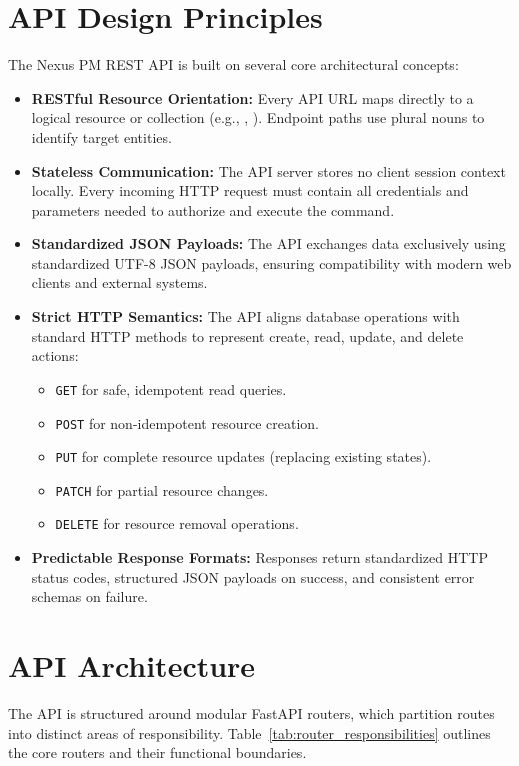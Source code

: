 \section{API Design Principles}
The Nexus PM REST API is built on several core architectural concepts:
\begin{itemize}
    \item \textbf{RESTful Resource Orientation:} Every API URL maps directly to a logical resource or collection (e.g., , ). Endpoint paths use plural nouns to identify target entities.
    \item \textbf{Stateless Communication:} The API server stores no client session context locally. Every incoming HTTP request must contain all credentials and parameters needed to authorize and execute the command.
    \item \textbf{Standardized JSON Payloads:} The API exchanges data exclusively using standardized UTF-8 JSON payloads, ensuring compatibility with modern web clients and external systems.
    \item \textbf{Strict HTTP Semantics:} The API aligns database operations with standard HTTP methods to represent create, read, update, and delete actions:
    \begin{itemize}
        \item \texttt{GET} for safe, idempotent read queries.
        \item \texttt{POST} for non-idempotent resource creation.
        \item \texttt{PUT} for complete resource updates (replacing existing states).
        \item \texttt{PATCH} for partial resource changes.
        \item \texttt{DELETE} for resource removal operations.
    \end{itemize}
    \item \textbf{Predictable Response Formats:} Responses return standardized HTTP status codes, structured JSON payloads on success, and consistent error schemas on failure.
\end{itemize}

\section{API Architecture}
The API is structured around modular FastAPI routers, which partition routes into distinct areas of responsibility. Table~\ref{tab:router_responsibilities} outlines the core routers and their functional boundaries.

